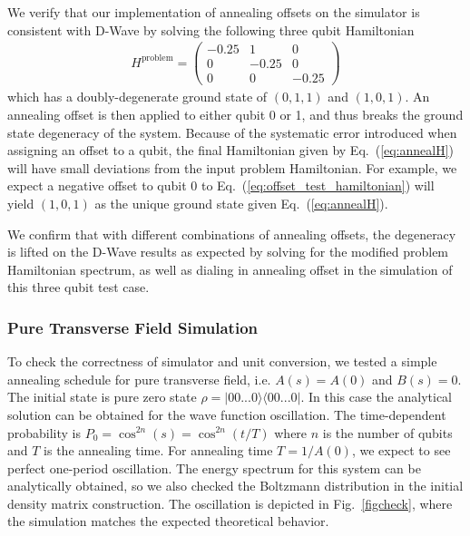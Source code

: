 \documentclass[prd,twocolumn,tightenlines,preprintnumbers,showpacs,superscriptaddress,notitlepage,nofootinbib,eqsecnum,floatfix,longbibliography,aps,10pt]{revtex4-1}
\begin{document}
We verify that our implementation of annealing offsets on the simulator is consistent with D-Wave by solving the following three qubit Hamiltonian
\begin{align}
	\label{eq:offset_test_hamiltonian}
	H^{\textrm{problem}} =
	\begin{pmatrix}
		-0.25 & 1 & 0 \\
		0 & -0.25 & 0 \\
		0 & 0 & -0.25
	\end{pmatrix}
\end{align}
which has a doubly-degenerate ground state of $(0, 1, 1)$ and $(1, 0, 1)$. An annealing offset is then applied to either qubit 0 or 1, and thus breaks the ground state degeneracy of the system. Because of the systematic error introduced when assigning an offset to a qubit, the final Hamiltonian given by Eq.~(\ref{eq:annealH}) will have small deviations from the input problem Hamiltonian. For example, we expect a negative offset to qubit 0 to Eq.~(\ref{eq:offset_test_hamiltonian}) will yield $(1, 0, 1)$ as the unique ground state given Eq.~(\ref{eq:annealH}).

We confirm that with different combinations of annealing offsets, the degeneracy is lifted on the D-Wave results as expected by solving for the modified problem Hamiltonian spectrum, as well as dialing in annealing offset in the simulation of this three qubit test case.


\subsubsection{Pure Transverse Field Simulation}
\label{sec:methods:simulation_details}
To check the correctness of simulator and unit conversion, we tested a simple annealing schedule for pure transverse field, i.e. $A(s)=A(0)$ and $B(s)=0$.
The initial state is pure zero state $\rho=|00...0\rangle \langle 00...0|$.
In this case the analytical solution can be obtained for the wave function oscillation.
The time-dependent probability is $P_{0}=\cos^{2n}(s)=\cos^{2n}(t/T)$ where $n$ is the number of qubits and $T$ is the annealing time.
For annealing time $T=1/A(0)$, we expect to see perfect one-period oscillation. The energy spectrum for this system can be analytically obtained, so we also checked the Boltzmann distribution in the initial density matrix construction. The oscillation is depicted in Fig.~\ref{figcheck}, where the simulation matches the expected theoretical behavior.
\end{document}
